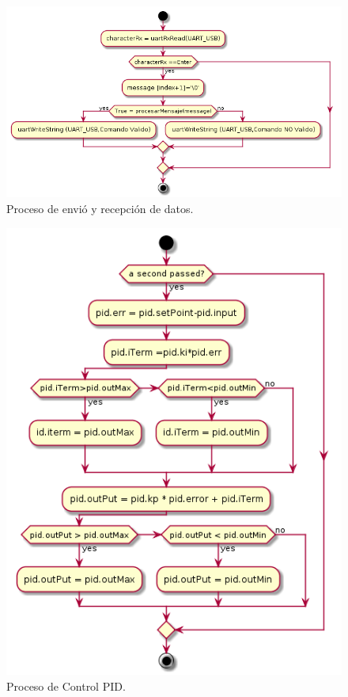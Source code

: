 	\begin{figure}[htpb]
	\centering
	\includegraphics[scale=.65]{./Figures/Porcesorecepcionyenviodedatos.png}
	\caption{Proceso de envió y recepción de datos.}
	\label{fig:Proceso De envió y recepción de datos}
	\end{figure}

	
\begin{figure}[htpb]
	\centering
	\includegraphics[scale=.65]{./Figures/procesocontrolPID.png}
	\caption{Proceso de Control PID.}
	\label{fig:Proceso de Control PID}
	\end{figure}
	
